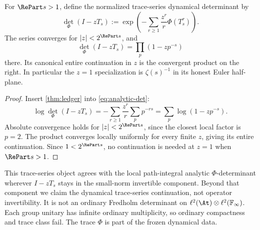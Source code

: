 \begin{theorem}
\label{thm:det}
For $\RePart s>1$, define the normalized trace-series dynamical determinant
by
\[
 \det_\Phi(I-zT_s)
 :=\exp\left(-\sum_{r\ge1}\frac{z^r}{r}\Phi(T_s^r)\right). \tag{4.3}
\]
The series converges for $|z|<2^{\RePart s}$, and
\[
 \det_\Phi(I-zT_s)=\prod_p(1-zp^{-s})        \tag{4.4}
\]
there.  Its canonical entire continuation in $z$ is the convergent product
on the right.  In particular the $z=1$ specialization is $\zeta(s)^{-1}$ in
its honest Euler half-plane.
\end{theorem}

\begin{proof}
Insert \cref{thm:ledger} into \cref{eq:analytic-det}:
\begin{equation}
 \log\det_\Phi(I-zT_s)
 =-\sum_{r\ge1}\frac{z^r}{r}\sum_pp^{-rs}
 =\sum_p\log(1-zp^{-s}).
 \label{eq:analytic-det}
\end{equation}
Absolute convergence holds for $|z|<2^{\RePart s}$, since the closest local
factor is $p=2$.  The product converges locally uniformly for every finite
$z$, giving its entire continuation.  Since $1<2^{\RePart s}$, no
continuation is needed at $z=1$ when $\RePart s>1$.
\end{proof}

This trace-series object agrees with the local path-integral analytic
$\Phi$-determinant wherever $I-zT_s$ stays in the small-norm invertible
component.  Beyond that component we claim the dynamical trace-series
continuation, not operator invertibility.  It is not an ordinary Fredholm
determinant on
$\ell^2(\At)\otimes\ell^2(\mathbb F_\infty)$.  Each group unitary has
infinite ordinary multiplicity, so ordinary compactness and trace class fail.
The trace $\Phi$ is part of the frozen dynamical data.
